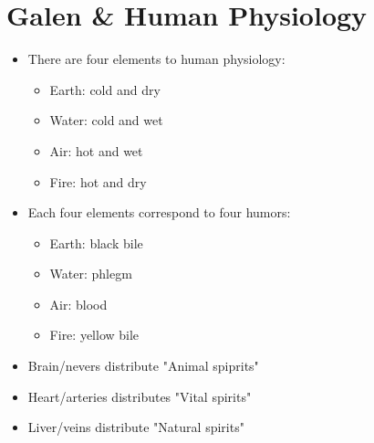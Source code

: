\documentclass{article}
\begin{document}
\section*{Galen \& Human Physiology}
\begin{itemize}
  \item There are four elements to human physiology:
    \begin{itemize}
      \item Earth: cold and dry
      \item Water: cold and wet
      \item Air: hot and wet
      \item Fire: hot and dry
    \end{itemize}
  \item Each four elements correspond to four humors:
    \begin{itemize}
      \item Earth: black bile
      \item Water: phlegm
      \item Air: blood
      \item Fire: yellow bile
    \end{itemize}
  \item Brain/nevers distribute "Animal spiprits"
  \item Heart/arteries distributes "Vital spirits"
  \item Liver/veins distribute "Natural spirits"
\end{itemize}
\end{document}
